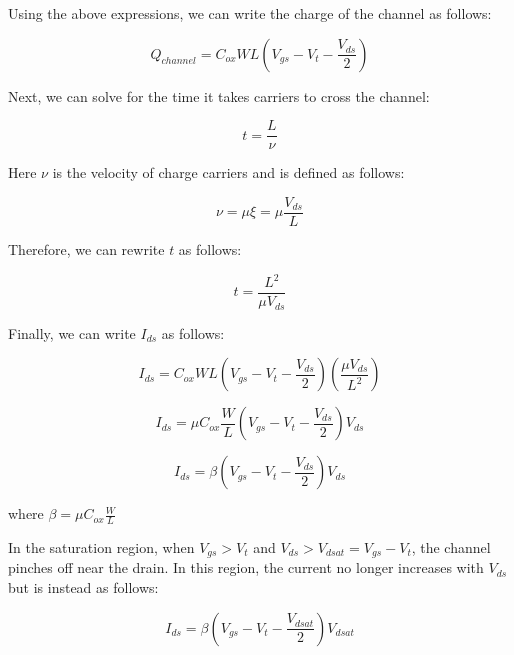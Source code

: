 \documentclass[fleqn]{article}
\begin{document}
\begin{enumerate}
		Using the above expressions, we can write the charge of the channel as follows:
		
		\begin{equation*}
			Q_{channel} = C_{ox}WL\left(V_{gs} - V_t - \frac{V_{ds}}{2}\right)
		\end{equation*}
		
		Next, we can solve for the time it takes carriers to cross the channel:
		
		\begin{equation*}
			t = \frac{L}{\nu}
		\end{equation*}
		
		Here $\nu$ is the velocity of charge carriers and is defined as follows:
		
		\begin{equation*}
			\nu = \mu\xi = \mu\frac{V_{ds}}{L}
		\end{equation*}
		
		Therefore, we can rewrite $t$ as follows:
		
		\begin{equation*}
			t = \frac{L^2}{\mu{V_{ds}}}
		\end{equation*}
		
		Finally, we can write $I_{ds}$ as follows:
		
		\begin{equation*}
			I_{ds} = C_{ox}WL\left(V_{gs} - V_t - \frac{V_{ds}}{2}\right)\left(\frac{\mu{V_{ds}}}{L^2}\right)
		\end{equation*}
		
		\begin{equation*}
			I_{ds} = \mu{C_{ox}}\frac{W}{L}\left(V_{gs} - V_t - \frac{V_{ds}}{2}\right)V_{ds}
		\end{equation*}
		
		\begin{equation*}
			I_{ds} = \beta\left(V_{gs} - V_t - \frac{V_{ds}}{2}\right)V_{ds}
		\end{equation*}
		
		where $\beta = \mu{C_{ox}}\frac{W}{L}$
		
		In the saturation region, when $V_{gs} > V_t$ and $V_{ds} > V_{dsat} = V_{gs} - V_t$, the channel pinches off near the drain. In this region, the current no longer increases with $V_{ds}$ but is instead as follows:
		
		\begin{equation*}		
			I_{ds} = \beta\left(V_{gs} - V_t - \frac{V_{dsat}}{2}\right)V_{dsat}
		\end{equation*}
		 

\end{enumerate}
\end{document}
